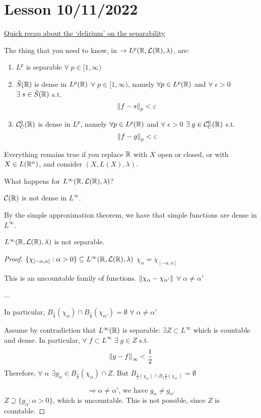 \section{Lesson 10/11/2022}
\underline{Quick recap about the `delirium' on the separability}

The thing that you need to know, in \(\to L^p(\mathbb{R}, \mathcal{L}(\mathbb{R}), \lambda)\), are:
\begin{enumerate}
    \item \(L^p\) is separable \(\forall\; p \in [1, \infty)\)
    \item \(\tilde{S}(\mathbb{R})\) is dense in \(L^p(\mathbb{R})\) \(\forall \; p \in [1, \infty)\), 
    namely \(\forall p \in L^p (\mathbb{R})\) and \(\forall \; \epsilon >0 \) \(\exists \; s \in \tilde{S}(\mathbb{R})\) s.t. 
    \[
        \norm{f-s}_p < \varepsilon
    \]
    \item \(\mathcal{C}_C^0 (\mathbb{R})\) is dense in \(L^p\), namely \(\forall p \in L^p (\mathbb{R})\) and \(\forall \; \epsilon >0 \) \(\exists \; g \in \mathcal{C}_C^0(\mathbb{R})\) s.t. 
    \[
        \norm{f-g}_p < \varepsilon
    \]
\end{enumerate}
Everything remains true if you replace \(\mathbb{R}\) with \(X\) open or closed, or with \(X \in L(\mathbb{R}^n)\), and consider \((X, L(X), \lambda)\).

What happens for \(L^{\infty}(\mathbb{R}, \mathcal{L}(\mathbb{R}), \lambda)\)? 

\(\mathcal{C}(\mathbb{R})\) is not dense in \(L^\infty\).

By the simple approximation theorem, we have that simple functions are dense in \(L^\infty\).
\begin{theorem}
    \(L^{\infty}(\mathbb{R}, \mathcal{L}(\mathbb{R}), \lambda)\) is not separable.
\end{theorem}
\begin{proof}
    \(\{\chi_{[-\alpha, \alpha]}: \alpha >0\} \subseteq L^{\infty}(\mathbb{R}, \mathcal{L}(\mathbb{R}), \lambda)\)
    \(\chi_\alpha = \chi_{[-\alpha, \alpha]}\)

    This is an uncountable family of functions. \(\norm{\chi_\alpha - \chi_{\alpha'}}\) \(\forall \; \alpha \neq \alpha'\)

    ...

    In particular, \(B_{\frac{1}{2}}(\chi_\alpha) \cap B_{\frac{1}{2}}(\chi_{\alpha '}) = \emptyset \) \(\forall \; \alpha \neq \alpha'\)

    Assume by contradiction that \(L^\infty(\mathbb{R})\) is separable: \(\exists Z \subset L^\infty\) which is countable and dense. In particular, \(\forall \; f \subset L^\infty\) \(\exists \; g \in Z\) s.t. 
    \[
        \norm{g-f }_\infty < \frac{1}{2}
    \]
    Therefore, \(\forall \; \alpha\) \(\exists g_\alpha \in B_{\frac{1}{2}}(\chi_\alpha) \cap Z\). 
    But \( B_{\frac{1}{2}(\chi_\alpha) \cap B_\{\frac{1}{2}(\chi_{\alpha'})} = \emptyset \)

    \[
        \Rightarrow \alpha \neq \alpha' \text{, we have } g_\alpha \neq g_{\alpha'}
    \]
    \(Z \supseteq \{ g_\alpha : \alpha >0 \}\), which is uncountable. This is not possible, since \(Z\) is countable.
\end{proof}

